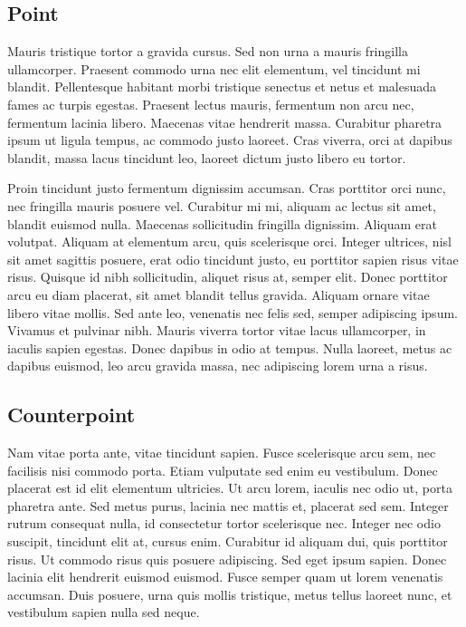 \documentclass[9pt]{memoir}
\begin{document}
\subsection{Point}
Mauris tristique tortor a gravida cursus. Sed non urna a mauris fringilla ullamcorper. Praesent commodo urna nec elit elementum, vel tincidunt mi blandit. Pellentesque habitant morbi tristique senectus et netus et malesuada fames ac turpis egestas. Praesent lectus mauris, fermentum non arcu nec, fermentum lacinia libero. Maecenas vitae hendrerit massa. Curabitur pharetra ipsum ut ligula tempus, ac commodo justo laoreet. Cras viverra, orci at dapibus blandit, massa lacus tincidunt leo, laoreet dictum justo libero eu tortor.

Proin tincidunt justo fermentum dignissim accumsan. Cras porttitor orci nunc, nec fringilla mauris posuere vel. Curabitur mi mi, aliquam ac lectus sit amet, blandit euismod nulla. Maecenas sollicitudin fringilla dignissim. Aliquam erat volutpat. Aliquam at elementum arcu, quis scelerisque orci. Integer ultrices, nisl sit amet sagittis posuere, erat odio tincidunt justo, eu porttitor sapien risus vitae risus. Quisque id nibh sollicitudin, aliquet risus at, semper elit. Donec porttitor arcu eu diam placerat, sit amet blandit tellus gravida. Aliquam ornare vitae libero vitae mollis. Sed ante leo, venenatis nec felis sed, semper adipiscing ipsum. Vivamus et pulvinar nibh. Mauris viverra tortor vitae lacus ullamcorper, in iaculis sapien egestas. Donec dapibus in odio at tempus. Nulla laoreet, metus ac dapibus euismod, leo arcu gravida massa, nec adipiscing lorem urna a risus.

\subsection{Counterpoint}
Nam vitae porta ante, vitae tincidunt sapien. Fusce scelerisque arcu sem, nec facilisis nisi commodo porta. Etiam vulputate sed enim eu vestibulum. Donec placerat est id elit elementum ultricies. Ut arcu lorem, iaculis nec odio ut, porta pharetra ante. Sed metus purus, lacinia nec mattis et, placerat sed sem. Integer rutrum consequat nulla, id consectetur tortor scelerisque nec. Integer nec odio suscipit, tincidunt elit at, cursus enim. Curabitur id aliquam dui, quis porttitor risus. Ut commodo risus quis posuere adipiscing. Sed eget ipsum sapien. Donec lacinia elit hendrerit euismod euismod. Fusce semper quam ut lorem venenatis accumsan. Duis posuere, urna quis mollis tristique, metus tellus laoreet nunc, et vestibulum sapien nulla sed neque.
\end{document}
